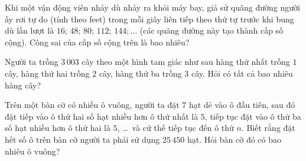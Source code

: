 \begin{ex}%
	Khi một vận động viên nhảy dù nhảy ra khỏi máy bay, giả sử quãng đường người ấy rơi tự do (tính theo feet) trong mỗi giây liên tiếp theo thứ tự trước khi bung dù lần lượt là $16; \,48;\, 80;\, 112;\, 144; \ldots$ (các quãng đường này tạo thành cấp số  cộng).
	Công sai của cấp số  cộng trên là bao nhiêu?
\end{ex}

\begin{ex}%
	Người ta trồng $3\,003$ cây theo một hình tam giác như sau hàng thứ nhất trồng $1$ cây, hàng thứ hai trồng $2$ cây, hàng thứ ba trồng $3$  cây. Hỏi có tất cả bao nhiêu hàng cây?
\end{ex}

\begin{ex}%
	Trên một bàn cờ có nhiều ô vuông, người ta đặt $7$ hạt dẻ vào ô đầu tiên, sau đó đặt tiếp vào ô thứ hai số hạt nhiều hơn ô thứ nhất là $5$, tiếp tục đặt vào ô thứ ba số hạt nhiều hơn ô thứ hai là $5$, \ldots\, và cứ thế tiếp tục  đến ô thứ $n$. Biết rằng đặt hết số ô trên bàn cờ người ta phải sử dụng $25\,450$ hạt. Hỏi bàn cờ đó có bao nhiêu ô vuông?
\end{ex}

